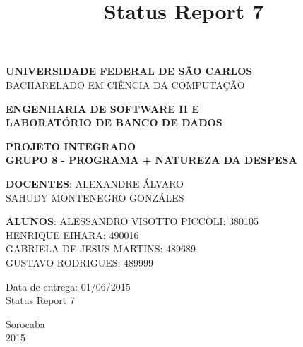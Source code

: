 \documentclass[a4paper,12pt]{article}
\title{Status Report 7}
\begin{document}
\renewcommand*\sectionmark[1]{\markboth{#1}{}}
\renewcommand*\subsectionmark[1]{\markboth{#1}{}}


\begin{titlepage}
\begin{center}
{\bf \large UNIVERSIDADE FEDERAL DE SÃO CARLOS}\\[0.2cm]
{\large BACHARELADO EM CIÊNCIA DA COMPUTAÇÃO}\\[0.2cm]

\end{center}

\vfill
\begin{center}
{\bf \large ENGENHARIA DE SOFTWARE II E\\LABORATÓRIO DE BANCO DE DADOS}\\[3.2cm]
\end{center}

\begin{center}
{\bf \LARGE PROJETO INTEGRADO}\\[0.3cm]
{\bf \Large GRUPO 8 - PROGRAMA + NATUREZA DA DESPESA}\\[2.2cm]
\end{center}

\vfill
\begin{flushright}
{\large \textbf{DOCENTES}: ALEXANDRE ÁLVARO}\\[0.2cm]
{\large SAHUDY MONTENEGRO GONZÁLES}\\[0.5cm]
\end{flushright}

\vfill
\begin{flushright}
{\large {\bf ALUNOS}: ALESSANDRO VISOTTO PICCOLI: 380105}\\[0.15cm]
{\large HENRIQUE EIHARA: 490016}\\[0.15cm]
{\large GABRIELA DE JESUS MARTINS: 489689}\\[0.15cm]
{\large GUSTAVO RODRIGUES: 489999}\\[0.15cm]
\end{flushright}

\vfill
\begin{flushright}
{\large Data de entrega: 01/06/2015}\\[0.2cm]
{\large Status Report 7}\\[2.0cm]
\end{flushright}

\begin{center}
{\large Sorocaba}\\[0.2cm]
{\large 2015}
\end{center}

\end{titlepage}
\end{document}
